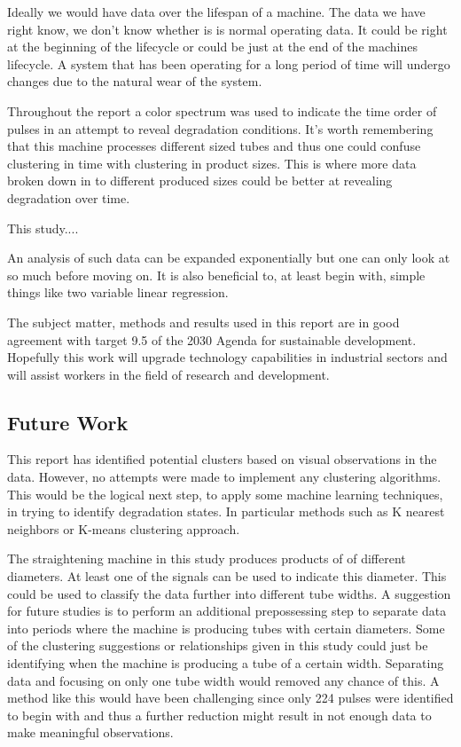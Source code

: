 \documentclass[]{article}
\begin{document}
Ideally we would have data over the lifespan of a machine. The data we have right know, we don't know whether is is normal operating data. It could be right at the beginning of the lifecycle or could be just at the end of the machines lifecycle. A system that has been operating for a long period of time will undergo changes due to the natural wear of the system.

Throughout the report a color spectrum was used to indicate the time order of pulses in an attempt to reveal degradation conditions. It's worth remembering that this machine processes different sized tubes and thus one could confuse clustering in time with clustering in product sizes. This is where more data broken down in to different produced sizes could be better at revealing degradation over time.

This study....

An analysis of such data can be expanded exponentially but one can only look at so much before moving on. It is also beneficial to, at least begin with, simple things like two variable linear regression.

The subject matter, methods and results used in this report are in good agreement with target 9.5 of the 2030 Agenda for sustainable development\cite{united2015department}. Hopefully this work will upgrade technology capabilities in industrial sectors and will assist workers in the field of research and development. 

\subsection{Future Work}
This report has identified potential clusters based on visual observations in the data. However, no attempts were made to implement any clustering algorithms. This would be the logical next step, to apply some machine learning techniques, in trying to identify degradation states. In particular methods such as K nearest neighbors or K-means clustering approach.

The straightening machine in this study produces products of of different diameters. At least one of the signals can be used to indicate this diameter. This could be used to classify the data further into different tube widths. A suggestion for future studies is to perform an additional prepossessing step to separate data into periods where the machine is producing tubes with certain diameters. Some of the clustering suggestions or relationships given in this study could just be identifying when the machine is producing a tube of a certain width. Separating data and focusing on only one tube width would removed any chance of this. A method like this would have been challenging since only 224 pulses were identified to begin with and thus a further reduction might result in not enough data to make meaningful observations.
\end{document}
